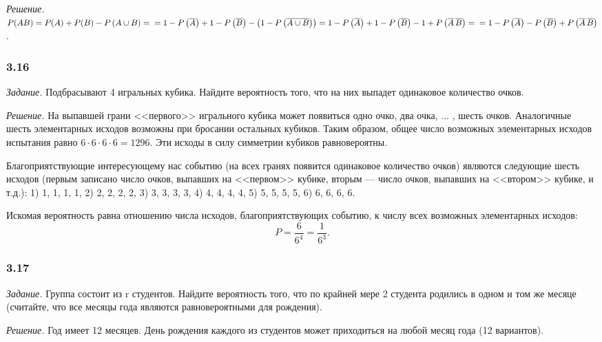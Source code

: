 \documentclass{book}
\begin{document}
\textit{Решение.}
$ P( AB ) =
P(A) + P(B) - P \left( A \cup B \right) = \\
= 1 - P \left( \overline{ A }\right) + 1 - P \left( \overline{ B } \right) - \left( 1 - P \left( \overline{ A \cup B } \right) \right) =
1 - P \left( \overline{ A } \right) + 1 - P \left( \overline{ B } \right) - 1 + P \left( \overline{ A } \, \overline{ B } \right) = \\
= 1 - P \left( \overline{ A } \right) - P \left( \overline{ B } \right) + P \left( \overline{ A } \, \overline{ B } \right) $.

\subsubsection*{3.16}

\textit{Задание.} Подбрасывают 4 игральных кубика.
Найдите вероятность того, что на них выпадет одинаковое количество очков.

\textit{Решение.} На выпавшей грани <<первого>> игрального кубика может появиться одно очко, два очка,  $ \dotsc $ , шесть очков.
Аналогичные шесть элементарных исходов возможны при бросании остальных кубиков.
Таким образом, общее число возможных элементарных исходов испытания равно $ 6 \cdot 6 \cdot 6 \cdot 6 = 1296 $.
Эти исходы в силу симметрии кубиков равновероятны.

Благоприятствующие интересующему нас событию
(на всех гранях появится одинаковое количество очков)
являются следующие шесть исходов
(первым записано число очков,
выпавших на <<первом>> кубике,
вторым --- число очков, выпавших на <<втором>> кубике, и т.д.): 1) 1, 1, 1, 1, 2) 2, 2, 2, 2, 3) 3, 3, 3, 3, 4) 4, 4, 4, 4, 5) 5, 5, 5, 5, 6) 6, 6, 6, 6.

Искомая вероятность равна отношению числа исходов, благоприятствующих событию, к числу всех возможных элементарных исходов:
$$ P =
\frac{6}{6^4} = \frac{1}{6^3}.$$

\subsubsection*{3.17}

\textit{Задание.} Группа состоит из r студентов.
Найдите вероятность того, что по крайней мере 2 студента родились в одном и том же месяце (считайте, что все месяцы года являются равновероятными для рождения).

\textit{Решение.} Год имеет 12 месяцев.
День рождения каждого из студентов может приходиться на любой месяц года (12 вариантов).
\end{document}
